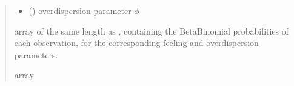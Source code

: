 \documentclass[letterpaper,10pt,english]{sphinxmanual}
\begin{document}
\begin{fulllineitems}
\begin{quote}
\begin{description}
\begin{itemize}
\item {} 
\sphinxAtStartPar
{} () \textendash{} overdispersion parameter \(\phi\)

\end{itemize}

\sphinxAtStartPar
array of the same length as , containing the Beta\sphinxhyphen{}Binomial probabilities of each observation,
for the corresponding feeling and overdispersion parameters.

\sphinxAtStartPar
array

\end{description}\end{quote}

\end{fulllineitems}

\end{document}
